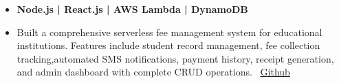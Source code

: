 \begin{itemize}
\item \textbf{Node.js | React.js | AWS Lambda | DynamoDB}
\item Built a  comprehensive serverless fee management system for educational institutions. Features include student record management, fee collection tracking,automated SMS notifications, payment history, receipt generation, and admin dashboard with complete CRUD operations. \
\href{https://github.com/Lakshit-Gupta/fee-management-system}{Github}
\end{itemize}
\smallskip
\smallskip












\cvproject{}
